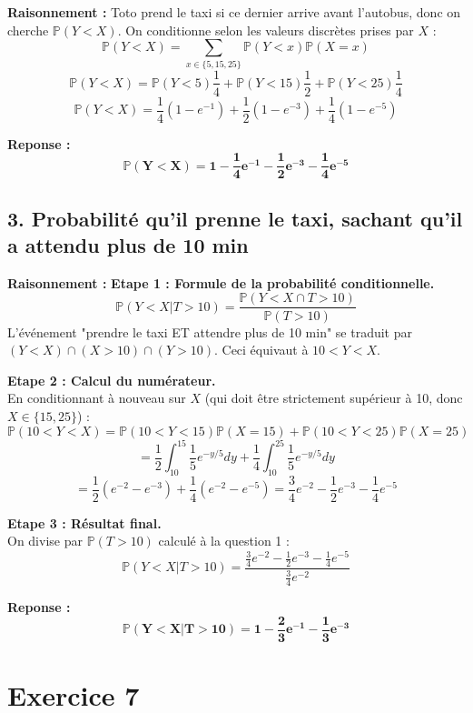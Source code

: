 \documentclass[11pt,a4paper]{article}
\begin{document}
\textbf{Raisonnement :}
Toto prend le taxi si ce dernier arrive avant l'autobus, donc on cherche $\mathbb{P}(Y < X)$.
On conditionne selon les valeurs discrètes prises par $X$ :
$$ \mathbb{P}(Y < X) = \sum_{x \in \{5, 15, 25\}} \mathbb{P}(Y < x) \mathbb{P}(X=x) $$
$$ \mathbb{P}(Y < X) = \mathbb{P}(Y < 5)\frac{1}{4} + \mathbb{P}(Y < 15)\frac{1}{2} + \mathbb{P}(Y < 25)\frac{1}{4} $$
$$ \mathbb{P}(Y < X) = \frac{1}{4}(1 - e^{-1}) + \frac{1}{2}(1 - e^{-3}) + \frac{1}{4}(1 - e^{-5}) $$

\textbf{Reponse :}
$$ \mathbf{\mathbb{P}(Y < X) = 1 - \frac{1}{4}e^{-1} - \frac{1}{2}e^{-3} - \frac{1}{4}e^{-5}} $$

\subsection*{3. Probabilité qu'il prenne le taxi, sachant qu'il a attendu plus de 10 min}

\textbf{Raisonnement :}
\textbf{Etape 1 : Formule de la probabilité conditionnelle.}\\
$$ \mathbb{P}(Y < X | T > 10) = \frac{\mathbb{P}(Y < X \cap T > 10)}{\mathbb{P}(T > 10)} $$
L'événement "prendre le taxi ET attendre plus de 10 min" se traduit par $(Y < X) \cap (X > 10) \cap (Y > 10)$. Ceci équivaut à $10 < Y < X$.

\textbf{Etape 2 : Calcul du numérateur.}\\
En conditionnant à nouveau sur $X$ (qui doit être strictement supérieur à 10, donc $X \in \{15, 25\}$) :
$$ \mathbb{P}(10 < Y < X) = \mathbb{P}(10 < Y < 15)\mathbb{P}(X=15) + \mathbb{P}(10 < Y < 25)\mathbb{P}(X=25) $$
$$ = \frac{1}{2} \int_{10}^{15} \frac{1}{5}e^{-y/5} dy + \frac{1}{4} \int_{10}^{25} \frac{1}{5}e^{-y/5} dy $$
$$ = \frac{1}{2} (e^{-2} - e^{-3}) + \frac{1}{4} (e^{-2} - e^{-5}) = \frac{3}{4}e^{-2} - \frac{1}{2}e^{-3} - \frac{1}{4}e^{-5} $$

\textbf{Etape 3 : Résultat final.}\\
On divise par $\mathbb{P}(T > 10)$ calculé à la question 1 :
$$ \mathbb{P}(Y < X | T > 10) = \frac{\frac{3}{4}e^{-2} - \frac{1}{2}e^{-3} - \frac{1}{4}e^{-5}}{\frac{3}{4}e^{-2}} $$

\textbf{Reponse :}
$$ \mathbf{\mathbb{P}(Y < X | T > 10) = 1 - \frac{2}{3}e^{-1} - \frac{1}{3}e^{-3}} $$

\hrulefill

\section*{Exercice 7}
\end{document}
